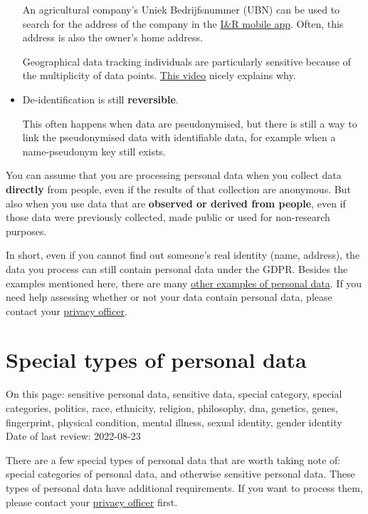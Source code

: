 \documentclass[
]{book}
\begin{document}
\begin{itemize}
  An agricultural company's Uniek Bedrijfsnummer (UBN) can be used to
  search for the address of the company in the
  \href{https://www.rvo.nl/onderwerpen/identificatie-en-registratie-dieren/app-ir-dieren}{I\&R mobile app}.
  Often, this address is also the owner's home address.

  Geographical data tracking individuals are particularly sensitive
  because of the multiplicity of data points.
  \href{https://www.youtube.com/watch?v=Pivd71NYKDA}{This video}
  nicely explains why.
\item
  De-identification is still \textbf{reversible}.

  This often happens when data are pseudonymised, but there is still a way
  to link the pseudonymised data with identifiable data, for example when a
  name-pseudonym key still exists.
\end{itemize}

You can assume that you are processing personal data when you collect data
\textbf{directly} from people, even if the results of that collection are anonymous. But
also when you use data that are \textbf{observed or derived from people}, even if those
data were previously collected, made public or used for non-research purposes.

In short, even if you cannot find out someone's real identity (name, address),
the data you process can still contain personal data under the GDPR. Besides
the examples mentioned here, there are many
\href{https://intranet.uu.nl/system/files/documenten/categories-of-personal-information-en.pdf}{other examples of personal data}.
If you need help assessing whether or not your data contain personal data,
please contact your \protect\hyperlink{support}{privacy officer}.

\hypertarget{special-types-personal-data}{%
\section{Special types of personal data}\label{special-types-personal-data}}

On this page: sensitive personal data, sensitive data, special category, special
categories, politics, race, ethnicity, religion, philosophy, dna,
genetics, genes, fingerprint, physical condition, mental illness, sexual
identity, gender identity\\
Date of last review: 2022-08-23

There are a few special types of personal data that are worth taking note of:
special categories of personal data, and otherwise sensitive personal data.
These types of personal data have additional requirements. If you want to
process them, please contact your \protect\hyperlink{support}{privacy officer} first.
\end{document}
